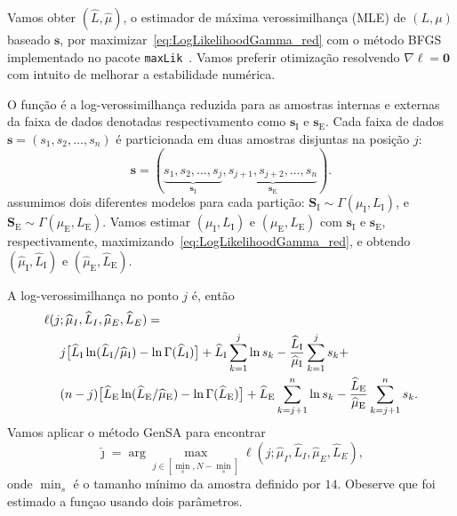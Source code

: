 Vamos obter $(\widehat L, \widehat \mu)$, o estimador de máxima verossimilhança (MLE) de $(L, \mu)$ baseado $\bm s$, por maximizar~\eqref{eq:LogLikelihoodGamma_red} com o método BFGS implementado no pacote \texttt{maxLik}~\citep{ht}. Vamos preferir otimização resolvendo $\nabla\ell=\bm 0$ com intuito de melhorar a estabilidade numérica.

O função é a log-verossimilhança reduzida para as amostras internas e externas da faixa de dados denotadas respectivamento como $\bm s_\text{I}$ e $\bm s_\text{E}$. Cada faixa de dados $\bm s = (s_1,s_2,\dots,s_n)$ é particionada em duas amostras disjuntas na posição $j$:  
$$
\bm s = (\underbrace{s_1,s_2,\dots,s_j}_{\bm s_\text{I}}, 
\underbrace{s_{j+1}, s_{j+2},\dots,s_n}_{\bm s_\text{E}}).
$$
assumimos dois diferentes modelos para cada partição:
$\bm S_\text{I} \sim \Gamma(\mu_\text{I},L_\text{I})$, e
$\bm S_\text{E} \sim \Gamma(\mu_\text{E},L_\text{E})$.
Vamos estimar $(\mu_\text{I},L_\text{I})$ e $(\mu_\text{E},L_\text{E})$ com $\bm s_\text{I}$ e $\bm s_\text{E}$, respectivamente, maximizando~\eqref{eq:LogLikelihoodGamma_red}, e obtendo $(\widehat{\mu}_\text{I}, \widehat{L}_\text{I})$ e $(\widehat{\mu}_\text{E}, \widehat{L}_\text{E})$.


A log-verossimilhança no ponto $j$ é, então
\begin{equation}\label{eq:TotalLogLikelihood}
\begin{split}
\ell(j&;\widehat{\mu}_I, \widehat{L}_I,\widehat{\mu}_E, \widehat{L}_E)=\\
&j \big[\widehat{L}_\text{I}\ln (\widehat{L}_\text{I} / \widehat{\mu}_\text{I}) - \ln \Gamma(\widehat{L}_\text{I})\big]
+\widehat{L}_\text{I} \sum_{k=1}^{j}\ln s_k -\frac{\widehat{L}_\text{I}}{\widehat{\mu}_\text{I}}\sum_{k=1}^{j} s_k +\\
&(n-j) \big[\widehat{L}_\text{E}\ln (\widehat{L}_\text{E} / \widehat{\mu}_\text{E}) - \ln \Gamma(\widehat{L}_\text{E})\big]
+\widehat{L}_\text{E} \sum_{k=j+1}^{n}\ln s_k - \frac{\widehat{L}_\text{E}}{\widehat{\mu}_\text{E}}\sum_{k=j+1}^{n} s_k.
\raisetag{2.2em}
\end{split}
\end{equation}
Vamos aplicar o método GenSA para encontrar
$$
\widehat{\jmath}= \arg\max\limits_{j\in [\min_s,N-\min_s]}\ell(j;\widehat{\mu}_I, \widehat{L}_I,\widehat{\mu}_E, \widehat{L}_E),
$$ 
onde $\min_s$ é o tamanho mínimo da amostra definido por $14$. Obeserve que foi estimado a funçao usando dois parâmetros. 

